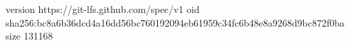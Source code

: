 version https://git-lfs.github.com/spec/v1
oid sha256:bc8a6b36dcd4a16dd56bc760192094eb61959c34fc6b48e8a9268d9bc872f0ba
size 131168
